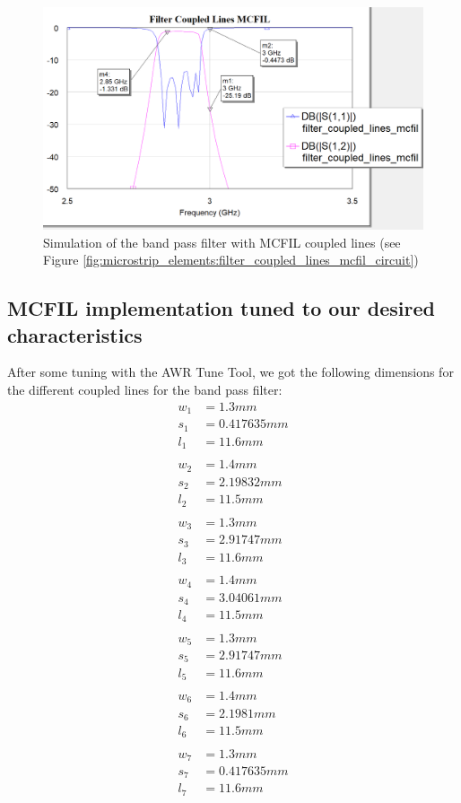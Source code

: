 \documentclass[12pt]{report} %
\begin{document}
\begin{figure}
    \centering
    \includegraphics[width=1\linewidth]{images//microstrip_elements/filter_coupled_lines_mcfil_graph.png}
    \caption{Simulation of the band pass filter with MCFIL coupled lines (see Figure \ref{fig:microstrip_elements:filter_coupled_lines_mcfil_circuit})}
    \label{fig:microstrip_elements:filter_coupled_lines_mcfil_graph}
\end{figure}

\subsection{MCFIL implementation tuned to our desired characteristics}

After some tuning with the AWR Tune Tool, we got the following dimensions for the different coupled lines for the band pass filter:
\begin{align*}
w_1 &= 1.3 mm\\
s_1 &= 0.417635 mm \\
l_1 &= 11.6 mm \\
\\
w_2 &= 1.4 mm \\
s_2 &= 2.19832 mm \\
l_2 &= 11.5 mm \\
\\
w_3 &= 1.3 mm \\
s_3 &= 2.91747 mm \\
l_3 &= 11.6 mm \\
\\
w_4 &= 1.4 mm \\
s_4 &= 3.04061 mm \\
l_4 &= 11.5 mm \\
\\
w_5 &= 1.3 mm \\
s_5 &= 2.91747 mm \\
l_5 &= 11.6 mm \\
\\
w_6 &= 1.4 mm \\
s_6 &= 2.1981 mm \\
l_6 &= 11.5 mm \\
\\
w_7 &= 1.3 mm \\
s_7 &= 0.417635 mm \\
l_7 &= 11.6 mm \\
\end{align*}
\end{document}
